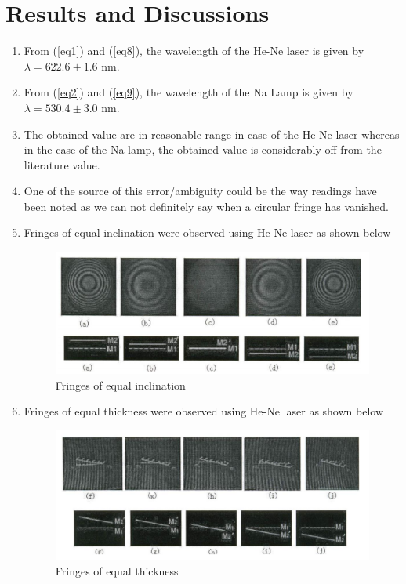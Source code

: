 \documentclass{article}
\begin{document}
\section{Results and Discussions}
\begin{enumerate}
    \item From (\ref{eq1}) and (\ref{eq8}), the wavelength of the He-Ne laser is given by $\lambda = 622.6 \pm 1.6$ nm.
    \item From (\ref{eq2}) and (\ref{eq9}), the wavelength of the Na Lamp is given by $\lambda = 530.4 \pm 3.0$ nm.
    \item The obtained value are in reasonable range in case of the He-Ne laser whereas in the case of the Na lamp, the obtained value is considerably off from the literature value.
    \item One of the source of this error/ambiguity could be the way readings have been noted as we can not definitely say when a circular fringe has vanished.
    \clearpage
    \item Fringes of equal inclination were observed using He-Ne laser as shown below
    \begin{figure}[h!]
        \centering
        \includegraphics[scale = 0.8]{Figures/fring of equal incl.png}
        \caption{Fringes of equal inclination}
        \label{fig:eqincl}
    \end{figure}
    \item Fringes of equal thickness were observed using He-Ne laser as shown below
    \begin{figure}[h!]
        \centering
        \includegraphics[scale = 0.8]{Figures/fring of equal thick.png}
        \caption{Fringes of equal thickness}
        \label{fig:my_label}
    \end{figure}
\end{enumerate}
\end{document}
